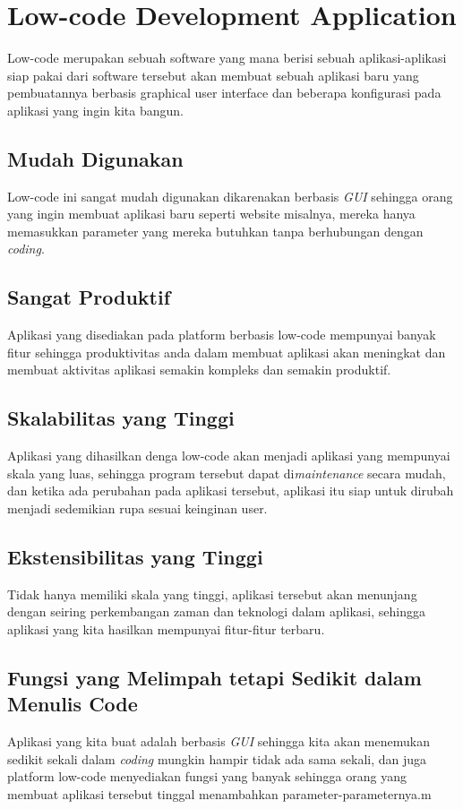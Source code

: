 \chapter{Low-code Development Application}
Low-code merupakan sebuah software yang mana berisi sebuah aplikasi-aplikasi siap pakai dari software tersebut akan membuat sebuah aplikasi baru yang pembuatannya berbasis graphical user interface dan beberapa konfigurasi pada aplikasi yang ingin kita bangun.

\section{Mudah Digunakan}
Low-code ini sangat mudah digunakan dikarenakan berbasis \textit{GUI} sehingga orang yang ingin membuat aplikasi baru seperti website misalnya, mereka hanya memasukkan parameter yang mereka butuhkan tanpa berhubungan dengan \textit{coding}.

\section{Sangat Produktif}
Aplikasi yang disediakan pada platform berbasis low-code mempunyai banyak fitur sehingga produktivitas anda dalam membuat aplikasi akan meningkat dan membuat aktivitas aplikasi semakin kompleks dan semakin produktif.

\section{Skalabilitas yang Tinggi}
Aplikasi yang dihasilkan denga low-code akan menjadi aplikasi yang mempunyai skala yang luas, sehingga program tersebut dapat di\textit{maintenance} secara mudah, dan ketika ada perubahan pada aplikasi tersebut, aplikasi itu siap untuk dirubah menjadi sedemikian rupa sesuai keinginan user.

\section{Ekstensibilitas yang Tinggi}
Tidak hanya memiliki skala yang tinggi, aplikasi tersebut akan menunjang dengan seiring perkembangan zaman dan teknologi dalam aplikasi, sehingga aplikasi yang kita hasilkan mempunyai fitur-fitur terbaru.

\section{Fungsi yang Melimpah tetapi Sedikit dalam Menulis Code}
Aplikasi yang kita buat adalah berbasis \textit{GUI} sehingga kita akan menemukan sedikit sekali dalam \textit{coding} mungkin hampir tidak ada sama sekali, dan juga platform low-code menyediakan fungsi yang banyak sehingga orang yang membuat aplikasi tersebut tinggal menambahkan parameter-parameternya.m